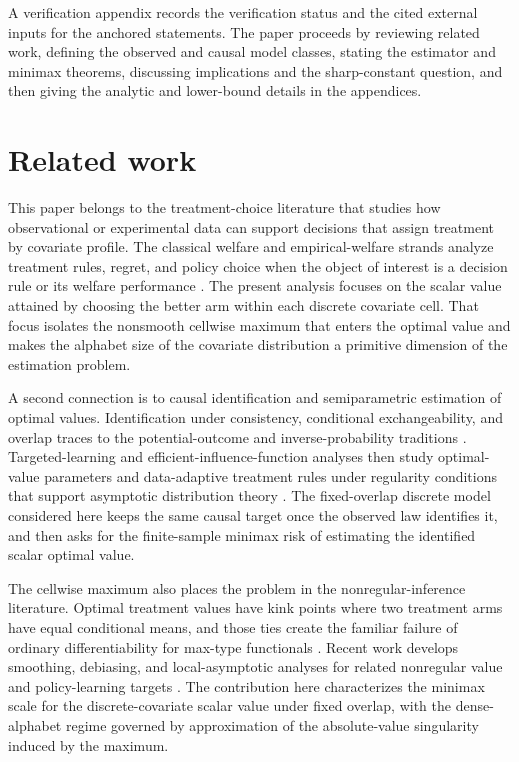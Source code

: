 \documentclass[11pt]{article}
\begin{document}
A verification appendix records the verification status and the cited external inputs for the anchored statements. The paper proceeds by reviewing related work, defining the observed and causal model classes, stating the estimator and minimax theorems, discussing implications and the sharp-constant question, and then giving the analytic and lower-bound details in the appendices.


\section{Related work}

This paper belongs to the treatment-choice literature that studies how observational or experimental data can support decisions that assign treatment by covariate profile. The classical welfare and empirical-welfare strands analyze treatment rules, regret, and policy choice when the object of interest is a decision rule or its welfare performance \citep{Manski2004,Murphy2003,Hirano2009,Kitagawa2018,Qian2011,Athey2021}. The present analysis focuses on the scalar value attained by choosing the better arm within each discrete covariate cell. That focus isolates the nonsmooth cellwise maximum that enters the optimal value and makes the alphabet size of the covariate distribution a primitive dimension of the estimation problem.

A second connection is to causal identification and semiparametric estimation of optimal values. Identification under consistency, conditional exchangeability, and overlap traces to the potential-outcome and inverse-probability traditions \citep{Robins1986,Rosenbaum1983}. Targeted-learning and efficient-influence-function analyses then study optimal-value parameters and data-adaptive treatment rules under regularity conditions that support asymptotic distribution theory \citep{vanDerLaan2015,LuedtkeVanderLaan2016OptimalValue}. The fixed-overlap discrete model considered here keeps the same causal target once the observed law identifies it, and then asks for the finite-sample minimax risk of estimating the identified scalar optimal value.

The cellwise maximum also places the problem in the nonregular-inference literature. Optimal treatment values have kink points where two treatment arms have equal conditional means, and those ties create the familiar failure of ordinary differentiability for max-type functionals \citep{Chakraborty2010,Hirano2012}. Recent work develops smoothing, debiasing, and local-asymptotic analyses for related nonregular value and policy-learning targets \citep{Chen2023,WhitehouseChenAusternSyrgkanis2025,Wei2025}. The contribution here characterizes the minimax scale for the discrete-covariate scalar value under fixed overlap, with the dense-alphabet regime governed by approximation of the absolute-value singularity induced by the maximum.
\end{document}

